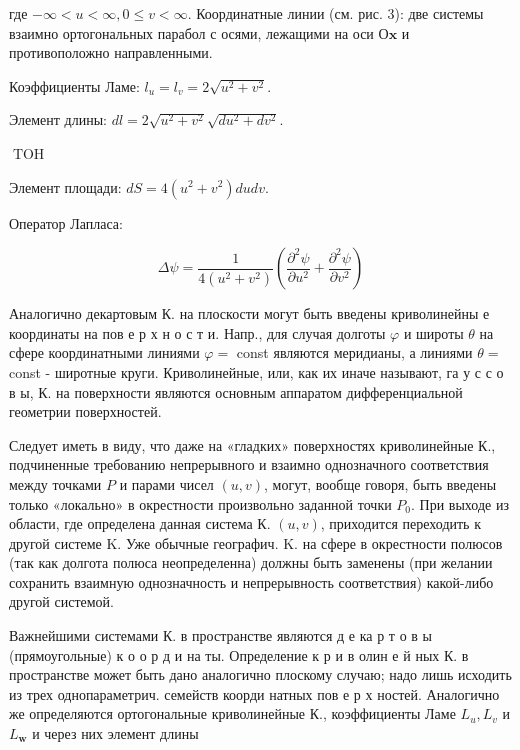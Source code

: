 \documentclass[10pt]{article}
\begin{document}
где $-\infty<u<\infty, 0 \leqslant v<\infty$. Координатные линии (см. рис. 3): две системы взаимно ортогональных парабол с осями, лежащими на оси $О \boldsymbol{x}$ и противоположно направленными.



Коэффициенты Ламе: $l_{u}=l_{v}=2 \sqrt{u^{2}+v^{2}}$.



Элемент длины: $d l=2 \sqrt{u^{2}+v^{2}} \sqrt{d u^{2}+d v^{2}}$.



$\operatorname{TOH}$



Элемент площади: $d S=4\left(u^{2}+v^{2}\right) d u d v$.



Оператор Лапласа:



\[

\Delta \psi=\frac{1}{4\left(u^{2}+v^{2}\right)}\left(\frac{\partial^{2} \psi}{\partial u^{2}}+\frac{\partial^{2} \psi}{\partial v^{2}}\right)

\]



Аналогично декартовым К. на плоскости могут быть введены криволинейны е координаты на пов е р х н о с т и. Напр., для случая долготы $\varphi$ и широты $\theta$ на сфере координатными линиями $\varphi=$ const являются меридианы, а линиями $\theta=$ const - широтные круги. Криволинейные, или, как их иначе называют, га у с с о в ы, К. на поверхности являются основным аппаратом дифференциальной геометрии поверхностей.



Следует иметь в виду, что даже на «гладких» поверхностях криволинейные К., подчиненные требованию непрерывного и взаимно однозначного соответствия между точками $P$ и парами чисел $(u, v)$, могут, вообще говоря, быть введены только «локально» в окрестности произвольно заданной точки $P_{0}$. При выходе из области, где определена данная система К. $(u, v)$, приходится переходить к другой системе K. Уже обычные географич. K. на сфере в окрестности полюсов (так как долгота полюса неопределенна) должны быть заменены (при желании сохранить взаимную однозначность и непрерывность соответствия) какой-либо другой системой.



Важнейшими системами К. в пространстве являются д е ка р т о в ы (прямоугольные) к о о р д и на ты. Определение к р и в олин е й ных К. в пространстве может быть дано аналогично плоскому случаю; надо лишь исходить из трех однопараметрич. семейств коорди натных пов е р х ностей. Аналогично же определяются ортогональные криволинейные К., коэффициенты Ламе $L_{u}, L_{v}$ и $L_{\boldsymbol{w}}$ и через них элемент длины
\end{document}
